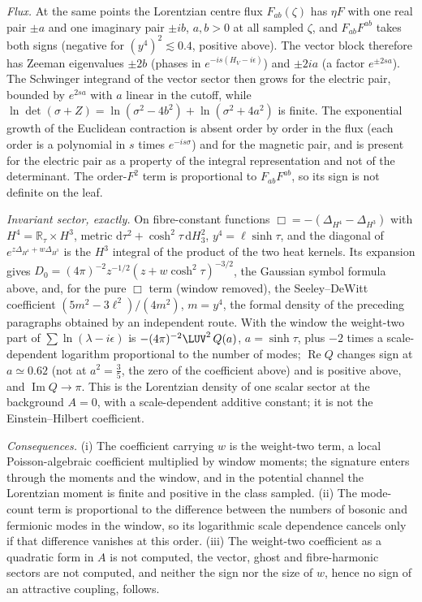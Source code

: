 \emph{Flux.} At the same points the Lorentzian centre flux \(F_{ab}(\zeta)\) has \(\eta F\) with one real pair \(\pm a\) and one imaginary pair \(\pm ib\), \(a,b>0\) at all sampled \(\zeta\), and \(F_{ab}F^{ab}\) takes both signs (negative for \((y^4)^2\lesssim0.4\), positive above). The vector block therefore has Zeeman eigenvalues \(\pm2b\) (phases in \(e^{-is(H_V-i\epsilon)}\)) and \(\pm2ia\) (a factor \(e^{\pm2sa}\)). The Schwinger integrand of the vector sector then grows for the electric pair, bounded by \(e^{2sa}\) with \(a\) linear in the cutoff, while \(\ln\det(\sigma+Z)=\ln(\sigma^2-4b^2)+\ln(\sigma^2+4a^2)\) is finite. The exponential growth of the Euclidean contraction is absent order by order in the flux (each order is a polynomial in \(s\) times \(e^{-is\sigma}\)) and for the magnetic pair, and is present for the electric pair as a property of the integral representation and not of the determinant. The order-\(F^2\) term is proportional to \(F_{ab}F^{ab}\), so its sign is not definite on the leaf.

\emph{Invariant sector, exactly.} On fibre-constant functions \(\Box=-(\Delta_{H^4}-\Delta_{H^3})\) with \(H^4=\mathbb R_\tau\times H^3\), metric \(\mathrm d\tau^2+\cosh^2\tau\,\mathrm dH_3^2\), \(y^4=\ell\sinh\tau\), and the diagonal of \(e^{z\Delta_{H^4}+w\Delta_{H^3}}\) is the \(H^3\) integral of the product of the two heat kernels. Its expansion gives \(D_0=(4\pi)^{-2}z^{-1/2}(z+w\cosh^2\tau)^{-3/2}\), the Gaussian symbol formula above, and, for the pure \(\Box\) term (window removed), the Seeley--DeWitt coefficient \((5m^2-3\ell^2)/(4m^2)\), \(m=y^4\), the formal density of the preceding paragraphs obtained by an independent route. With the window the weight-two part of \(\sum\ln(\lambda-i\epsilon)\) is \(-(4\pi)^{-2}\LUV^2\,Q(a)\), \(a=\sinh\tau\), plus \(-2\) times a scale-dependent logarithm proportional to the number of modes; \(\operatorname{Re}Q\) changes sign at \(a\simeq0.62\) (not at \(a^2=\tfrac35\), the zero of the coefficient above) and is positive above, and \(\operatorname{Im}Q\to\pi\). This is the Lorentzian density of one scalar sector at the background \(A=0\), with a scale-dependent additive constant; it is not the Einstein--Hilbert coefficient.

\emph{Consequences.} (i) The coefficient carrying \(w\) is the weight-two term, a local Poisson-algebraic coefficient multiplied by window moments; the signature enters through the moments and the window, and in the potential channel the Lorentzian moment is finite and positive in the class sampled. (ii) The mode-count term is proportional to the difference between the numbers of bosonic and fermionic modes in the window, so its logarithmic scale dependence cancels only if that difference vanishes at this order. (iii) The weight-two coefficient as a quadratic form in \(A\) is not computed, the vector, ghost and fibre-harmonic sectors are not computed, and neither the sign nor the size of \(w\), hence no sign of an attractive coupling, follows.

